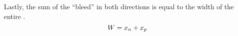 Lastly, the sum of the ``bleed'' in both directions is equal to the width of the entire .
\begin{equation}\label{eq:Depletion_Layer-Directions_Sum}
  W = x_{n} + x_{p}
\end{equation}

